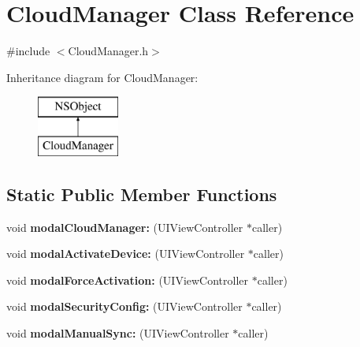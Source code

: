 \hypertarget{interface_cloud_manager}{
\section{\-Cloud\-Manager \-Class \-Reference}
\label{interface_cloud_manager}
}


{\ttfamily \#include $<$\-Cloud\-Manager.\-h$>$}

\-Inheritance diagram for \-Cloud\-Manager\-:\begin{figure}[H]
\begin{center}
\leavevmode
\includegraphics[height=2.000000cm]{interface_cloud_manager}
\end{center}
\end{figure}
\subsection*{\-Static \-Public \-Member \-Functions}
\begin{DoxyCompactItemize}
\item 
\hypertarget{interface_cloud_manager_a6ae267e8d2feb7cf7319b0b780cd85c8}{
void {\bfseries modal\-Cloud\-Manager\-:} (\-U\-I\-View\-Controller $\ast$caller)}
\label{interface_cloud_manager_a6ae267e8d2feb7cf7319b0b780cd85c8}

\item 
\hypertarget{interface_cloud_manager_aa8ae774ab9ecc8f7fd3fdf21449f37b6}{
void {\bfseries modal\-Activate\-Device\-:} (\-U\-I\-View\-Controller $\ast$caller)}
\label{interface_cloud_manager_aa8ae774ab9ecc8f7fd3fdf21449f37b6}

\item 
\hypertarget{interface_cloud_manager_ac5541c0c77016bb5f3d6b9667d4e1045}{
void {\bfseries modal\-Force\-Activation\-:} (\-U\-I\-View\-Controller $\ast$caller)}
\label{interface_cloud_manager_ac5541c0c77016bb5f3d6b9667d4e1045}

\item 
\hypertarget{interface_cloud_manager_ae4bf44780cd8facd28c00a7bbeec2bf1}{
void {\bfseries modal\-Security\-Config\-:} (\-U\-I\-View\-Controller $\ast$caller)}
\label{interface_cloud_manager_ae4bf44780cd8facd28c00a7bbeec2bf1}

\item 
\hypertarget{interface_cloud_manager_a87109519e8ddadef9d1f711704f34fc6}{
void {\bfseries modal\-Manual\-Sync\-:} (\-U\-I\-View\-Controller $\ast$caller)}
\label{interface_cloud_manager_a87109519e8ddadef9d1f711704f34fc6}

\end{DoxyCompactItemize}


